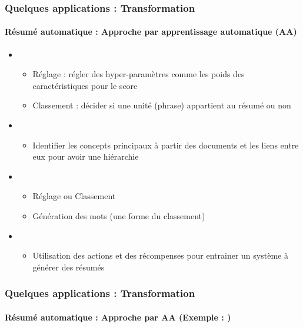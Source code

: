 \documentclass[xcolor=table]{beamer}
\begin{document}
%	
%	

\begin{frame}
	\frametitle{Quelques applications : Transformation}
	\framesubtitle{Résumé automatique : Approche par apprentissage automatique (AA)}
	
	\begin{itemize}
		\item {}
		\begin{itemize}
			\item Réglage : régler des hyper-paramètres comme les poids des caractéristiques pour le score
			\item Classement : décider si une unité (phrase) appartient au résumé ou non
		\end{itemize}
		\item {}
		\begin{itemize}
			\item Identifier les concepts principaux à partir des documents et les liens entre eux pour avoir une hiérarchie
		\end{itemize}
		\item {}
		\begin{itemize}
			\item Réglage ou Classement
			\item Génération des mots (une forme du classement)
		\end{itemize}
		\item {}
		\begin{itemize}
			\item Utilisation des actions et des récompenses pour entrainer un système à générer des résumés
		\end{itemize}
	\end{itemize}
	
\end{frame}


\begin{frame}
	\frametitle{Quelques applications : Transformation}
	\framesubtitle{Résumé automatique : Approche par AA (Exemple : \cite{2020-aries})}
	
	\begin{center}
	\end{center}
	
\end{frame}
\end{document}
